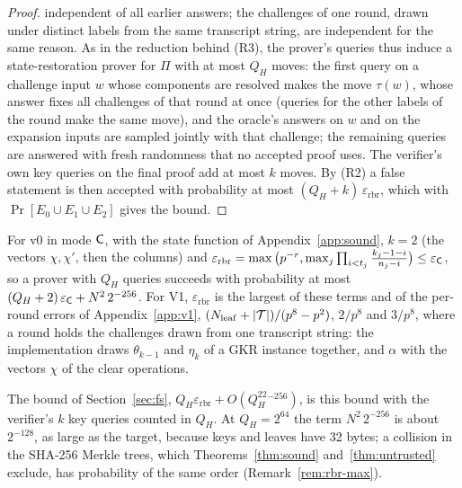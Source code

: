 \begin{proof}
independent of all earlier answers; the challenges of one round, drawn under distinct labels from
the same transcript string, are independent for the same reason.
As in the reduction behind (R3), the prover's queries thus induce a state-restoration prover for
$\Pi$ with at most $Q_H$ moves: the first query on a challenge input $w$ whose components are resolved
makes the move $\tau(w)$, whose answer fixes all challenges of that round at once (queries for the
other labels of the round make the same move), and the oracle's answers on $w$ and on the expansion
inputs are sampled jointly with that challenge; the remaining queries are answered with fresh
randomness that no accepted proof uses. The verifier's own key queries on the final proof add at
most $k$ moves. By (R2) a false statement is then accepted with probability at most
$(Q_H+k)\,\varepsilon_{\mathrm{rbr}}$, which with $\Pr[E_0\cup E_1\cup E_2]$ gives the bound.
\end{proof}

\begin{corollary}
\label{cor:fs-v0}
For v0 in mode $\mathsf{C}$, with the state function of Appendix~\ref{app:sound}, $k=2$ (the vectors
$\chi,\chi'$, then the columns) and
$\varepsilon_{\mathrm{rbr}}=\max\big(p^{-r},\max_j\prod_{i<t_j}\tfrac{k_j-1-i}{n_j-i}\big)\le
\varepsilon_{\mathsf{C}}$, so a prover with $Q_H$ queries succeeds with probability at most
$(Q_H+2)\,\varepsilon_{\mathsf{C}}+N^2\,2^{-256}$. For V1, $\varepsilon_{\mathrm{rbr}}$ is the largest of
these terms and of the per-round errors of Appendix~\ref{app:v1}, $(N_{\mathrm{leaf}}+|\mathcal{T}|)/(p^8-p^2)$,
$2/p^8$ and $3/p^8$, where a round holds the challenges drawn from one transcript string: the
implementation draws $\theta_{k-1}$ and $\eta_k$ of a GKR instance together, and $\alpha$ with the
vectors $\chi$ of the clear operations.
\end{corollary}

\noindent The bound of Section~\ref{sec:fs}, $Q_H\varepsilon_{\mathrm{rbr}}+O(Q_H^22^{-256})$, is this
bound with the verifier's $k$ key queries counted in $Q_H$. At $Q_H=2^{64}$ the term
$N^2\,2^{-256}$ is about $2^{-128}$, as large as the target, because keys and leaves have 32 bytes;
a collision in the SHA-256 Merkle trees, which Theorems~\ref{thm:sound} and~\ref{thm:untrusted}
exclude, has probability of the same order (Remark~\ref{rem:rbr-max}).

